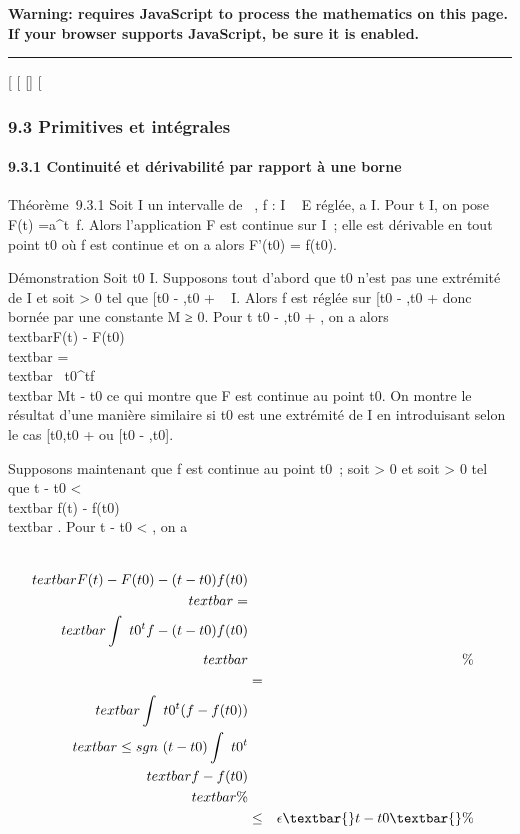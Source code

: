 \textbf{Warning: 
requires JavaScript to process the mathematics on this page.\\ If your
browser supports JavaScript, be sure it is enabled.}

\begin{center}\rule{3in}{0.4pt}\end{center}

{[}
{[}
{[}{]}
{[}

\subsubsection{9.3 Primitives et intégrales}

\paragraph{9.3.1 Continuité et dérivabilité par rapport à une borne}

Théorème~9.3.1 Soit I un intervalle de ~, f : I \rightarrow~ E réglée, a \in I. Pour
t \in I, on pose F(t) =\int  a^t~f.
Alors l'application F est continue sur I~; elle est dérivable en tout
point t0 où f est continue et on a alors F'(t0) =
f(t0).

Démonstration Soit t0 \in I. Supposons tout d'abord que
t0 n'est pas une extrémité de I et soit \eta \textgreater{} 0 tel
que {[}t0 - \eta,t0 + \eta{]} \subset~ I. Alors f est réglée sur
{[}t0 - \eta,t0 + \eta{]} donc bornée par une constante M
≥ 0. Pour t \in {[}t0 - \eta,t0 + \eta{]}, on a alors
\\textbar{}F(t) -
F(t0)\\textbar{}
=\\textbar{}\int ~
t0^tf\\textbar{} \leq M\textbar{}t
- t0\textbar{} ce qui montre que F est continue au point
t0. On montre le résultat d'une manière similaire si
t0 est une extrémité de I en introduisant selon le cas
{[}t0,t0 + \eta{]} ou {[}t0 -
\eta,t0{]}.

Supposons maintenant que f est continue au point t0~; soit \epsilon
\textgreater{} 0 et soit \eta \textgreater{} 0 tel que \textbar{}t -
t0\textbar{} \textless{} \eta \rigtharrow~\\textbar{} f(t) -
f(t0)\\textbar{} \leq \epsilon. Pour \textbar{}t -
t0\textbar{} \textless{} \eta, on a

\begin{align*} \\textbar{}F(t) -
F(t0) - (t -
t0)f(t0)\\textbar{}
=\\textbar{}\int ~
t0^tf - (t - t
0)f(t0)\\textbar{}&&\%&
\\ & =&
\\textbar{}\int ~
t0^t(f - f(t
0))\\textbar{} \leq sgn~(t -
t0)\int ~
t0^t\\textbar{}f - f(t
0)\\textbar{}\%& \\ &
\leq& \epsilon\textbar{}t - t0\textbar{} \%&
\\ \end{align*}

